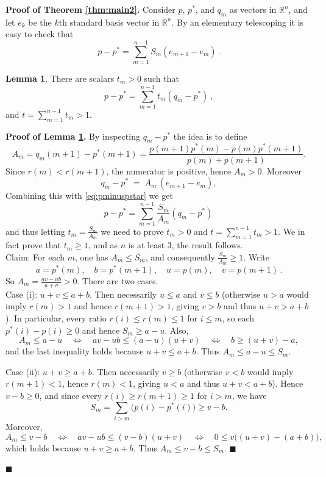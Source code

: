 \documentclass[10pt, letterpaper]{article}%
\theoremstyle{definition}
\newtheorem{lemma}[theorem]{Lemma}
\renewenvironment{proof}[1][\unskip]{%
\par
\noindent
\textbf{Proof #1.}
\noindent}
{\hfill$\blacksquare$

\bigskip}
\newcommand{\1}{\mathbf 1}
\begin{document}
\begin{proof}[of Theorem \ref{thm:main2}]
	Consider $p$, $p^*$, and $q_m$ as vectors in $\mathbb{R}^n$, and let $e_k$ be the $k$th standard basis vector in $\mathbb{R}^n$.
	By an elementary telescoping it is easy to check that
	\begin{equation}
		p-p^* = \sum_{m=1}^{n-1}S_m(e_{m+1}-e_m)\,. \label{eq:pminuspstar}
	\end{equation}
	\begin{lemma}\label{seged}
		There are scalars $t_m>0$ such that
		\[
			p-p^* = \sum_{m=1}^{n-1}t_m(q_m-p^*)\,,
		\]
		and $t = \sum_{m=1}^{n-1}t_m > 1$.
	\end{lemma}
	\begin{proof}[of Lemma \ref{seged}]
		By inspecting $q_m-p^*$ the idea is to define
		\[
			A_m = q_m(m+1)-p^*(m+1)=\frac{p(m+1)p^*(m)-p(m)p^*(m+1)}{p(m)+p(m+1)}.
		\]
		Since $r(m)<r(m+1)$, the numerator is positive, hence $A_m>0$.
		Moreover
		\begin{equation}\label{eq:qm-shift}
			q_m-p^* \;=\; A_m\,(e_{m+1}-e_m),
		\end{equation}
		Combining this with \eqref{eq:pminuspstar} we get
		\[
			p-p^* = \sum_{m=1}^{n-1}\frac{S_m}{A_m}(q_m-p^*)\,
		\]
		and thus letting $t_m = \frac{S_m}{A_m}$ we need to prove $t_m>0$ and $t = \sum_{m=1}^{n-1}t_m > 1$.
		We in fact prove that $t_m\geq 1$, and as $n$ is at least $3$, the result follows.\\
		
		\noindent Claim: For each $m$, one has $A_m\le S_m$, and consequently $\frac{S_m}{A_m}\ge 1$.
		Write
		\[
			a =p^*(m),\quad  b=p^*(m+1),\quad u=p(m), \quad v=p(m+1)\,.
		\]
		So $A_m=\frac{av-ub}{u+v}>0$. There are two cases.\\

		\noindent Case (i): $u+v\le a+b$. Then necessarily $u\le a$ and $v\le b$
		(otherwise $u>a$ would imply $r(m)>1$ and hence	$r(m+1)>1$, giving $v>b$ and thus $u+v>a+b$).
		In particular, every ratio $r(i)\le r(m)\le 1$ for $i\le m$, so each $p^*(i)-p(i)\ge 0$ and hence $S_m\ge a-u$.
		Also,
		\[
			A_m\le a-u
			\quad\Longleftrightarrow\quad
			av-ub \le (a-u)(u+v)
			\quad\Longleftrightarrow\quad
			b \ge (u+v)-a,
		\]
		and the last inequality holds because $u+v\le a+b$. Thus $A_m\le a-u\le S_m$.

		\noindent Case (ii): $u+v\ge a+b$. Then necessarily $v\ge b$ (otherwise $v<b$ would imply $r(m+1)<1$, hence $r(m)<1$, giving $u<a$ and
		thus $u+v<a+b$). Hence $v-b\ge 0$, and since every $r(i)\ge r(m+1)\ge 1$ for $i>m$, we have
		\[
		S_m=\sum_{i>m}\bigl(p(i)-p^*(i)\bigr)\ge v-b.
		\]
		Moreover,
		\[
		A_m\le v-b
		\quad\Longleftrightarrow\quad
		av-ub \le (v-b)(u+v)
		\quad\Longleftrightarrow\quad
		0 \le v\bigl((u+v)-(a+b)\bigr),
		\]
		which holds because $u+v\ge a+b$. Thus $A_m\le v-b\le S_m$.
	\end{proof}
	

\end{proof}
\end{document}
